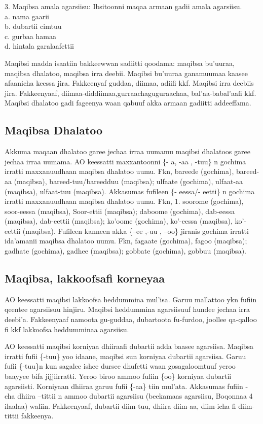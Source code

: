 \documentclass[11pt,b5paper]{book}
\begin{document}
3. Maqibsa amala agarsiisu: Ibsitoonni maqaa armaan gadii amala agarsiisu.\\
a. nama gaarii \\
b. dubartii cimtuu \\
c. gurbaa hamaa \\
d. hintala garalaafettii 

Maqibsi madda isaatiin bakkeewwan sadiitti qoodama: maqibsa
bu'uuraa, maqibsa dhalatoo, maqibsa irra deebii. Maqibsi
bu’uuraa ganamuumaa kaasee afaanicha keessa jira.
Fakkeenyaf guddaa, diimaa, adiifi kkf. Maqibsi irra deebiis
jira. Fakkeenyaaf, diimaa-diddiimaa,gurraachaguguraachaa, bal’aa-babal’aafi kkf. Maqibsi dhalatoo gadi
fageenya waan qabuuf akka armaan gadiitti addeeffama. 

\subsection{Maqibsa Dhalatoo}

Akkuma maqaan dhalatoo garee jechaa irraa uumamu maqibsi dhalatoos garee jechaa irraa uumama. AO keessatti
maxxantoonni \{- a, -aa , -tuu\} n gochima irratti maxxanuudhaan maqibsa dhalatoo uumu. Fkn, bareede (gochima), bareed-aa (maqibsa), bareed-tuu/bareedduu (maqibsa); ulfaate (gochima), ulfaat-aa (maqibsa), ulfaat-tuu (maqibsa). Akkasumas fufileen \{- eessa/- eetti\} n gochima irratti maxxanuudhaan maqibsa dhalatoo uumu. Fkn, 1. soorome (gochima), soor-eessa (maqibsa), Soor-ettii (maqibsa); daboome (gochima), dab-eessa (maqibsa), dab-eettii (maqibsa); ko’oome (gochima), ko’-eessa (maqibsa), ko’-eettii (maqibsa). Fufileen kanneen akka \{–ee ,-uu , –oo\} jiranis gochima irratti ida’amanii maqibsa dhalatoo uumu. Fkn, fagaate (gochima), fagoo (maqibsa); gadhate (gochima), gadhee (maqibsa); gobbate (gochima), gobbuu (maqibsa).

\subsection{Maqibsa, lakkoofsafi korneyaa}
AO keessatti maqibsi lakkoofsa heddummina mul'isa. Garuu mallattoo ykn fufiin qeentee agarsiisuu hinjiru. Maqibsi
heddummina agarsiisuuf hundee jechaa irra deebi'a. Fakkeenyaaf namoota gu-guddaa, dubartoota fu-furdoo, joollee qa-qalloo fi kkf lakkoofsa heddumminaa agarsiisu. 

AO keessatti maqibsi korniyaa dhiiraafi dubartii adda baasee agarsiisa. Maqibsa irratti fufii \{-tuu\} yoo idaane, maqibsi sun korniyaa dubartii agarsiisa. Garuu fufii \{-tuu\}n kun sagalee ishee dursee dhufetti waan gosagaloomtuuf yeroo baayyee bifa jijjiirratti. Yeroo biroo ammoo fufiin \{oo\} korniyaa dubartii agarsiisti. Korniyaan dhiiraa garuu fufii \{-aa\} tiin mul'ata. Akkasumas fufiin - cha dhiira –tittii n ammoo dubartii agarsiisu (beekamaas agarsiisu, Boqonnaa 4 ilaalaa) waliin. Fakkeenyaaf, dubartii diim-tuu, dhiira diim-aa, diim-icha fi diim-tittii fakkeenya.
\end{document}

